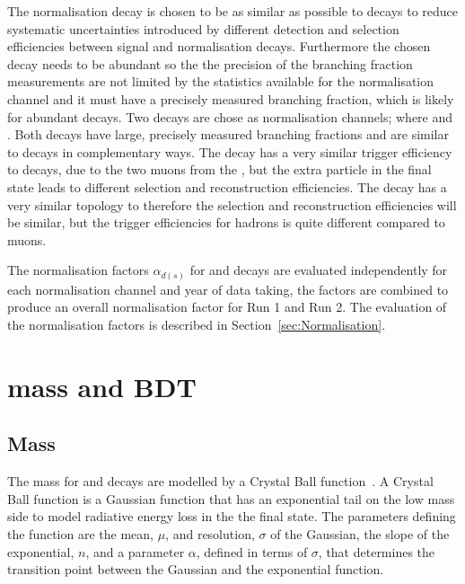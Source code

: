 {The normalisation decay is chosen to be as similar as possible to \bmumu decays to reduce systematic uncertainties introduced by different detection and selection efficiencies between signal and normalisation decays. Furthermore the chosen decay needs to be abundant so the the precision of the \bmumu branching fraction measurements are not limited by the statistics available for the normalisation channel and it must have a precisely measured branching fraction, which is likely for abundant decays. Two decays are chose as normalisation channels; \bujpsik where \jpsimumu and \bdkpi. Both decays have large, precisely measured branching fractions and are similar to \bmumu decays in complementary ways. The \bujpsik decay has a very similar trigger efficiency to \bmumu decays, due to the two muons from the \jpsi, but the extra particle in the final state leads to different selection and reconstruction efficiencies. The \bdkpi decay has a very similar topology to \bmumu therefore the selection and reconstruction efficiencies will be similar, but the trigger efficiencies for hadrons is quite different compared to muons.  

The normalisation factors $\alpha_{d(s)}$ for \bdmumu and \bsmumu decays are evaluated independently for each normalisation channel and year of data taking, the factors are combined to produce an overall normalisation factor for Run 1 and Run 2. The evaluation of the normalisation factors is described in Section~\ref{sec:Normalisation}.



\section{\bsmumu mass and BDT \pdfs}
\label{sec:signalPdfs}

\subsection{Mass \pdfs}
The mass \pdfs for \bdmumu and \bsmumu decays are modelled by a Crystal Ball function~\cite{Skwarnicki:1986xj}. A Crystal Ball function is a Gaussian function that has an exponential tail on the low mass side to model radiative energy loss in the the final state. The parameters defining the function are the mean, $\mu$, and resolution, $\sigma$ of the Gaussian, the slope of the exponential, $n$, and a parameter $\alpha$, defined in terms of $\sigma$, that determines the transition point between the Gaussian and the exponential function. 

}
